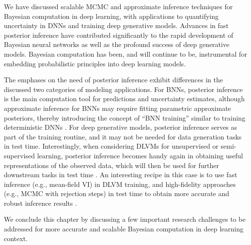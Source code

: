 We have discussed scalable MCMC and approximate inference techniques for Bayesian computation in deep learning, with applications to quantifying uncertainty in DNNs and training deep generative models. 
Advances in fast posterior inference have contributed significantly to the rapid development of Bayesian neural networks as well as the profound success of deep generative models. Bayesian computation has been, and will continue to be, instrumental for embedding probabilistic principles into deep learning models.

%
The emphases on the need of posterior inference exhibit differences in the discussed two categories of modeling applications. For BNNs, posterior inference is the main computation tool for predictions and uncertainty estimates, although approximate inference for BNNs may require fitting parametric approximate posteriors, thereby introducing the concept of ``BNN training'' similar to training deterministic DNNs \citep{blundell2015bbp,gal2016thesis,wilson2020bayesian}. For deep generative models, posterior inference serves as part of the training routine, and it may not be needed for data generation tasks in test time. Interestingly, when considering DLVMs for unsupervised or semi-supervised learning, posterior inference becomes handy again in obtaining useful representations of the observed data, which will then be used for further downstream tasks in test time \citep{kingma2014semi,higgins2016beta,tschannen2018recent}. An interesting recipe in this case is to use fast inference (e.g., mean-field VI) in DLVM training, and high-fidelity approaches (e.g., MCMC with rejection steps) in test time to obtain more accurate and robust inference results \citep{kuzina2022alleviating}.

%
We conclude this chapter by discussing a few important research challenges to be addressed for more accurate and scalable Bayesian computation in deep learning context. 

